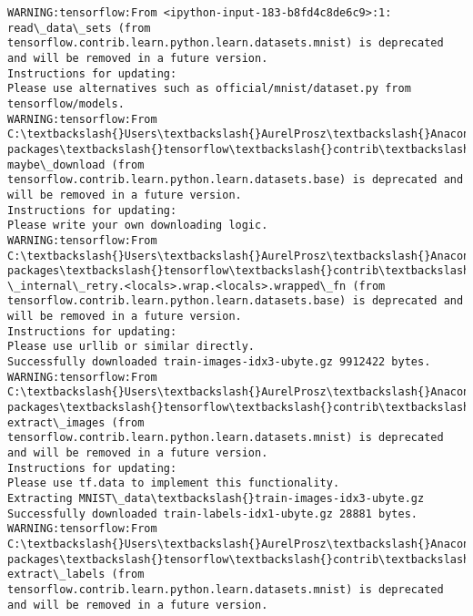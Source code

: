 \documentclass[11pt]{article}
\begin{document}
    \begin{Verbatim}[commandchars=\\\{\}]
WARNING:tensorflow:From <ipython-input-183-b8fd4c8de6c9>:1: read\_data\_sets (from tensorflow.contrib.learn.python.learn.datasets.mnist) is deprecated and will be removed in a future version.
Instructions for updating:
Please use alternatives such as official/mnist/dataset.py from tensorflow/models.
WARNING:tensorflow:From C:\textbackslash{}Users\textbackslash{}AurelProsz\textbackslash{}Anaconda3\textbackslash{}envs\textbackslash{}keras2\textbackslash{}lib\textbackslash{}site-packages\textbackslash{}tensorflow\textbackslash{}contrib\textbackslash{}learn\textbackslash{}python\textbackslash{}learn\textbackslash{}datasets\textbackslash{}mnist.py:260: maybe\_download (from tensorflow.contrib.learn.python.learn.datasets.base) is deprecated and will be removed in a future version.
Instructions for updating:
Please write your own downloading logic.
WARNING:tensorflow:From C:\textbackslash{}Users\textbackslash{}AurelProsz\textbackslash{}Anaconda3\textbackslash{}envs\textbackslash{}keras2\textbackslash{}lib\textbackslash{}site-packages\textbackslash{}tensorflow\textbackslash{}contrib\textbackslash{}learn\textbackslash{}python\textbackslash{}learn\textbackslash{}datasets\textbackslash{}base.py:252: \_internal\_retry.<locals>.wrap.<locals>.wrapped\_fn (from tensorflow.contrib.learn.python.learn.datasets.base) is deprecated and will be removed in a future version.
Instructions for updating:
Please use urllib or similar directly.
Successfully downloaded train-images-idx3-ubyte.gz 9912422 bytes.
WARNING:tensorflow:From C:\textbackslash{}Users\textbackslash{}AurelProsz\textbackslash{}Anaconda3\textbackslash{}envs\textbackslash{}keras2\textbackslash{}lib\textbackslash{}site-packages\textbackslash{}tensorflow\textbackslash{}contrib\textbackslash{}learn\textbackslash{}python\textbackslash{}learn\textbackslash{}datasets\textbackslash{}mnist.py:262: extract\_images (from tensorflow.contrib.learn.python.learn.datasets.mnist) is deprecated and will be removed in a future version.
Instructions for updating:
Please use tf.data to implement this functionality.
Extracting MNIST\_data\textbackslash{}train-images-idx3-ubyte.gz
Successfully downloaded train-labels-idx1-ubyte.gz 28881 bytes.
WARNING:tensorflow:From C:\textbackslash{}Users\textbackslash{}AurelProsz\textbackslash{}Anaconda3\textbackslash{}envs\textbackslash{}keras2\textbackslash{}lib\textbackslash{}site-packages\textbackslash{}tensorflow\textbackslash{}contrib\textbackslash{}learn\textbackslash{}python\textbackslash{}learn\textbackslash{}datasets\textbackslash{}mnist.py:267: extract\_labels (from tensorflow.contrib.learn.python.learn.datasets.mnist) is deprecated and will be removed in a future version.

\end{Verbatim}
\end{document}
